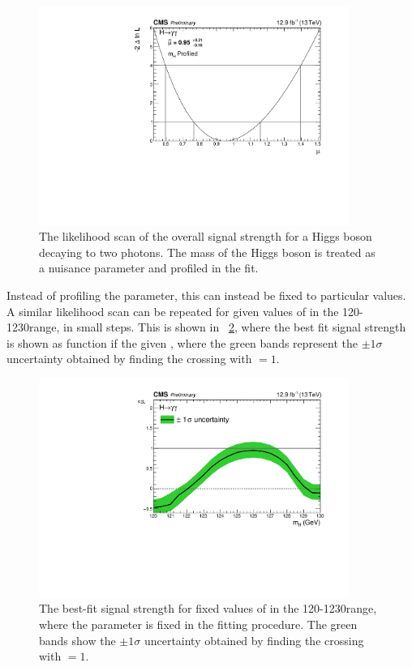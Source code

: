 \begin{figure}[ht!]
\centering
\includegraphics[width=0.9\textwidth]{statandresultsFigures/MuScanProfileMH.pdf} 
\caption{The likelihood scan of the overall signal strength for a Higgs boson decaying to two photons. The mass of the Higgs boson is treated as a nuisance parameter and profiled in the fit.}

\label{fig:statandresults:global_mu}
\end{figure}

Instead of profiling the \mH parameter, this can instead be fixed to particular values. A similar likelihood scan can be repeated for given values of \mH in the 120-1230\GeV range, in small steps. This is shown in \Fig~\ref{fig:statandresults:mu_vs_mh}, where the best fit signal strength is shown as function if the given \mH, where the green bands represent the $\pm 1 \sigma$ uncertainty obtained by finding the crossing with \DNLL$=1$.  

\begin{figure}[ht!]
\centering
\includegraphics[width=0.9\textwidth]{statandresultsFigures/MuHat_vs_MH.pdf} 
\caption{The best-fit signal strength for fixed values of \mH in the 120-1230\GeV range, where the \mH parameter is fixed in the fitting procedure. The green bands show  the $\pm 1 \sigma$ uncertainty obtained by finding the crossing with \DNLL$=1$.  }

\label{fig:statandresults:mu_vs_mh}
\end{figure}

